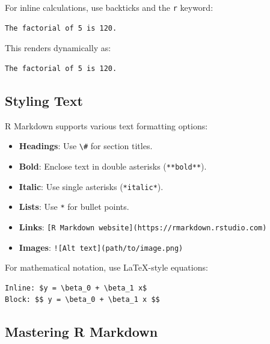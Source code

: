 \documentclass[
]{book}
\newcommand{\passthrough}[1]{#1}
\providecommand{\tightlist}{%
  \setlength{\itemsep}{0pt}\setlength{\parskip}{0pt}}
\theoremstyle{definition}
\theoremstyle{definition}
\theoremstyle{definition}
\theoremstyle{definition}
\theoremstyle{remark}
\begin{document}
For inline calculations, use backticks and the \passthrough{\lstinline!r!} keyword:

\begin{lstlisting}
The factorial of 5 is 120.
\end{lstlisting}

This renders dynamically as:

\begin{lstlisting}
The factorial of 5 is 120.
\end{lstlisting}

\subsection*{Styling Text}\label{styling-text}

R Markdown supports various text formatting options:

\begin{itemize}
\tightlist
\item
  \textbf{Headings}: Use \passthrough{\lstinline!\#!} for section titles.\\
\item
  \textbf{Bold}: Enclose text in double asterisks (\passthrough{\lstinline!**bold**!}).\\
\item
  \textbf{Italic}: Use single asterisks (\passthrough{\lstinline!*italic*!}).\\
\item
  \textbf{Lists}: Use \passthrough{\lstinline!*!} for bullet points.\\
\item
  \textbf{Links}: \passthrough{\lstinline![R Markdown website](https://rmarkdown.rstudio.com)!}\\
\item
  \textbf{Images}: \passthrough{\lstinline"![Alt text](path/to/image.png)"}
\end{itemize}

For mathematical notation, use LaTeX-style equations:

\begin{lstlisting}
Inline: $y = \beta_0 + \beta_1 x$  
Block: $$ y = \beta_0 + \beta_1 x $$
\end{lstlisting}

\subsection*{Mastering R Markdown}\label{mastering-r-markdown}
\end{document}
